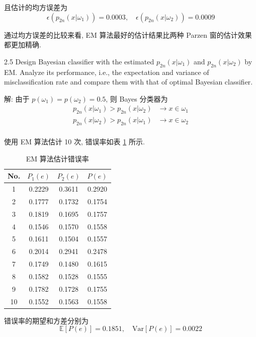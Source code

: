 \documentclass{article}
\begin{document}
且估计的均方误差为
\begin{equation}
  \epsilon(p_{2n}(x|\omega_1))=0.0003,\quad \epsilon(p_{2n}(x|\omega_2))=0.0009
\end{equation}

通过均方误差的比较来看, EM 算法最好的估计结果比两种 Parzen 窗的估计效果都更加精确.

2.5 Design Bayesian classifier with the estimated $p_{2n}(x|\omega_{1})$ and $p_{2n}(x|\omega_{2})$ by EM. Analyze its performance, i.e., the expectation and variance of misclassification rate and compare them with that of optimal Bayesian classifier.

解: 由于 $p(\omega_{1})=p(\omega_{2})= 0.5$, 则 Bayes 分类器为
\begin{equation}
  \begin{aligned}
    p_{2n}(x|\omega_1) > p_{2n}(x|\omega_2) &\to x\in\omega_1\\
    p_{2n}(x|\omega_2) > p_{2n}(x|\omega_1) &\to x\in\omega_2\\
  \end{aligned}
\end{equation}

使用 EM 算法估计 10 次, 错误率如表 \ref{tab:emErr} 所示.

\begin{table}[htbp]
  \centering
  \caption{EM 算法估计错误率}
  \label{tab:emErr}
  \begin{tabular}{c|ccc}
    \hline
    No. & $P_1(e)$ & $P_2(e)$ & $P(e)$ \\
    \hline
    1  & 0.2229  & 0.3611 & 0.2920 \\
    2  & 0.1777  & 0.1732 & 0.1754 \\
    3  & 0.1819  & 0.1695 & 0.1757 \\
    4  & 0.1546  & 0.1570 & 0.1558 \\
    5  & 0.1611  & 0.1504 & 0.1557 \\
    6  & 0.2014  & 0.2941 & 0.2478 \\
    7  & 0.1749  & 0.1480 & 0.1615 \\
    8  & 0.1582  & 0.1528 & 0.1555 \\
    9  & 0.1782  & 0.1728 & 0.1755 \\
    10 & 0.1552  & 0.1563 & 0.1558 \\
    \hline  
  \end{tabular}
\end{table}

错误率的期望和方差分别为
\begin{equation}
  \mathbb{E}[P(e)]=0.1851,\quad \mathrm{Var}[P(e)]=0.0022
\end{equation}
\end{document}
